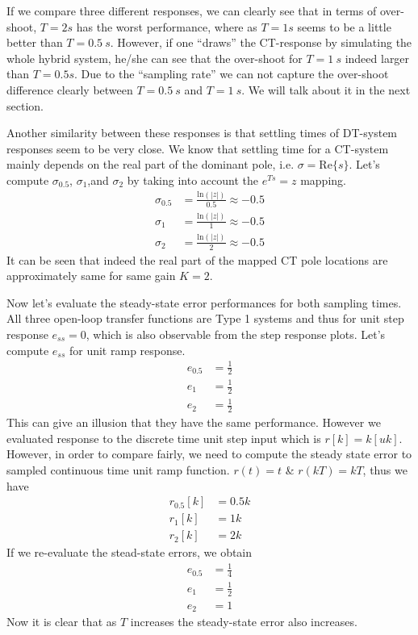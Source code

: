 \documentclass[twoside]{article}
\begin{document}
If we compare three different responses, we can clearly see that
in terms of over-shoot, $T=2s$ has the worst performance,
where as $T = 1 s$ seems to be a little better than $T = 0.5 \ s$. 
However, if one ``draws'' the CT-response by simulating the
whole hybrid system, he/she can see that the over-shoot for $T=1 \ s$
indeed larger than $T = 0.5 s$. Due to the ``sampling rate''
we can not capture the over-shoot difference clearly between $T = 0.5 \ s$
and $T = 1 \ s$. We will talk about it in the next section.

Another similarity between these responses is that settling times
of DT-system responses seem to be very close. We know that settling 
time for a CT-system mainly depends on the real part of the
dominant pole, i.e. $\sigma = \mathrm{Re} \lbrace s \rbrace$. 
Let's compute $\sigma_{0.5}$, $\sigma_{1}$,and $\sigma_2$ by taking 
into account the $e^{Ts} = z$ mapping.
%
\begin{align*}
\sigma_{0.5} &= \frac{\mathrm{ln}(|z|) }{0.5} \approx -0.5
\\
\sigma_{1} &= \frac{\mathrm{ln}(|z|) }{1} \approx -0.5
\\
\sigma_{2} &= \frac{\mathrm{ln}(|z|) }{2} \approx -0.5
\end{align*}
%
It can be seen that indeed the real part of the mapped CT
pole locations are approximately same for same gain $K=2$.

Now let's evaluate the steady-state error performances for both
sampling times. All three open-loop transfer functions are Type 1
systems and thus for unit step response $e_{ss} = 0$, which is also
observable from the step response plots. Let's compute $e_{ss}$
for unit ramp response.
%
\begin{align*}
  e_{0.5} &= \frac{1}{2} \\
  e_{1} &= \frac{1}{2} \\
  e_{2} &= \frac{1}{2}
\end{align*}
%
This can give an illusion that they have the same performance. However
we evaluated response to the discrete time unit step input which is 
$r[k] = k [uk]$. However, in order to compare fairly, we need to compute the
steady state error to sampled continuous time unit ramp function. 
$r(t) = t$ \& $r(kT) = kT$, thus we have
%
\begin{align*}
  r_{0.5}[k] &= 0.5 k \\
  r_{1}[k] &= 1 k \\
  r_{2}[k] &= 2 k
\end{align*}
%
If we re-evaluate the stead-state errors, we obtain
%
%
\begin{align*}
  e_{0.5} &= \frac{1}{4} \\
  e_{1} &= \frac{1}{2} \\
  e_{2} &= 1
\end{align*}
%
Now it is clear that as $T$ increases the steady-state error 
also increases. 
\end{document}
